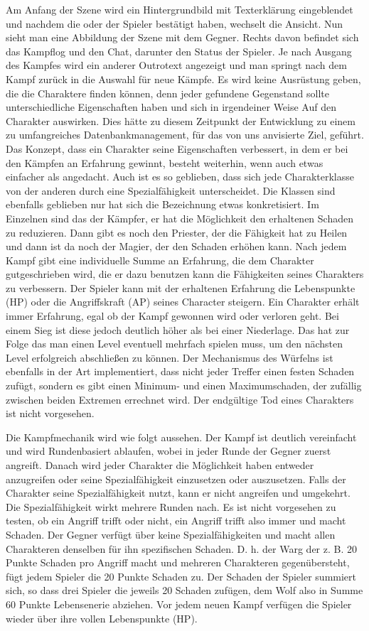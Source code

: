 Am Anfang der Szene wird ein Hintergrundbild mit Texterklärung eingeblendet und nachdem die oder der Spieler bestätigt haben, wechselt die Ansicht. Nun sieht man eine Abbildung der Szene mit dem Gegner. Rechts davon befindet sich das Kampflog und den Chat, darunter den Status der Spieler. Je nach Ausgang des Kampfes wird ein anderer Outrotext angezeigt und man springt nach dem Kampf zurück in die Auswahl für neue Kämpfe. Es wird keine Ausrüstung geben, die die Charaktere finden können, denn jeder gefundene Gegenstand sollte unterschiedliche Eigenschaften haben und sich in irgendeiner Weise Auf den Charakter auswirken. Dies hätte zu diesem Zeitpunkt der Entwicklung zu einem zu umfangreiches Datenbankmanagement, für das von uns anvisierte Ziel, geführt. Das Konzept, dass ein Charakter seine Eigenschaften verbessert, in dem er bei den Kämpfen an Erfahrung gewinnt, besteht weiterhin, wenn auch etwas einfacher als angedacht. Auch ist es so geblieben, dass sich jede Charakterklasse von der anderen durch eine Spezialfähigkeit unterscheidet. Die Klassen sind ebenfalls geblieben nur hat sich die Bezeichnung etwas konkretisiert. Im Einzelnen sind das der Kämpfer, er hat die Möglichkeit den erhaltenen Schaden zu reduzieren. Dann gibt es noch den Priester, der die Fähigkeit hat zu Heilen und dann ist da noch der Magier, der den Schaden erhöhen kann. Nach jedem Kampf gibt eine individuelle Summe an Erfahrung, die dem Charakter gutgeschrieben wird, die er dazu benutzen kann die Fähigkeiten seines Charakters zu verbessern. Der Spieler kann mit der erhaltenen Erfahrung die Lebenspunkte (HP) oder die Angriffskraft (AP) seines Character steigern. Ein Charakter erhält immer Erfahrung, egal ob der Kampf gewonnen wird oder verloren geht. Bei einem Sieg ist diese jedoch deutlich höher als bei einer Niederlage. Das hat zur Folge das man einen Level eventuell mehrfach spielen muss, um den nächsten Level erfolgreich abschließen zu können. Der Mechanismus des Würfelns ist ebenfalls in der Art implementiert, dass nicht jeder Treffer einen festen Schaden zufügt, sondern es gibt einen Minimum- und einen Maximumschaden, der zufällig zwischen beiden Extremen errechnet wird. Der endgültige Tod eines Charakters ist nicht vorgesehen. 

Die Kampfmechanik wird wie folgt aussehen. Der Kampf ist deutlich vereinfacht und wird Rundenbasiert ablaufen, wobei in jeder Runde der Gegner zuerst angreift. Danach wird jeder Charakter die Möglichkeit haben entweder anzugreifen oder seine Spezialfähigkeit einzusetzen oder auszusetzen. Falls der Charakter seine Spezialfähigkeit nutzt, kann er nicht angreifen und umgekehrt. Die Spezialfähigkeit wirkt mehrere Runden nach. Es ist nicht vorgesehen zu testen, ob ein Angriff trifft oder nicht, ein Angriff trifft also immer und macht Schaden. Der Gegner verfügt über keine Spezialfähigkeiten und macht allen Charakteren denselben für ihn spezifischen Schaden. D. h. der Warg der z. B. 20 Punkte Schaden pro Angriff macht und mehreren Charakteren gegenübersteht, fügt jedem Spieler die 20 Punkte Schaden zu. Der Schaden der Spieler summiert sich, so dass drei Spieler die jeweils 20 Schaden zufügen, dem Wolf also in Summe 60 Punkte Lebensenerie abziehen. Vor jedem neuen Kampf verfügen die Spieler wieder über ihre vollen Lebenspunkte (HP).

